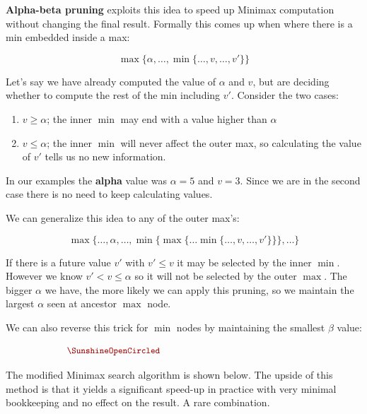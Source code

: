 \documentclass[11pt]{article}
\begin{document}
\textbf{Alpha-beta pruning} exploits this idea to speed up Minimax computation without changing the final result. Formally this comes up when where there is a min embedded inside a max:

\[ \max\{ \alpha, \ldots,  \min\{\ldots, v, \ldots, v' \} \}\]
  
\noindent Let's say we have already computed the value of $\alpha$ and $v$, but are deciding whether to compute the rest of the min including $v'$. Consider the two cases:

\begin{enumerate}
\item  $v \geq \alpha$; the inner $\min$ may end with a value higher than $\alpha$ 
\item  $v \leq \alpha$; the inner $\min$ will never affect the outer max, so calculating the value of $v'$ tells us no new information. 
\end{enumerate}

In our examples the \textbf{alpha} value was $\alpha = 5$ and $v=3$. Since we are in the second case there is no need to keep calculating values.

We can generalize this idea to any of the outer max's:

\[ \max\{ \ldots, \alpha, \ldots, \min\{ \max\{\ldots \min\{\ldots, v, \ldots, v' \} \}\} , \ldots\}\]

If there is a future value $v'$ with $v' \leq v$ it may be selected by the inner $\min$. However we know $v' < v \leq \alpha$ so it will not be selected by the outer $\max$. The bigger $\alpha$ we have, the more likely we can apply this pruning, so we maintain the largest $\alpha$ seen at ancestor $\max$ node. 

We can also reverse this trick for $\min$ nodes by maintaining the smallest $\beta$ value:

\[ \censorm{\min\{ \ldots, \beta, \ldots, \max\{ \min\{\ldots \min\{\ldots, v, \ldots, v' \} \}\} , \ldots\} }\]

The modified Minimax search algorithm is shown below.
The upside of this method is that it yields a significant speed-up in practice with very minimal bookkeeping and no effect on the result. A rare combination.
\end{document}
